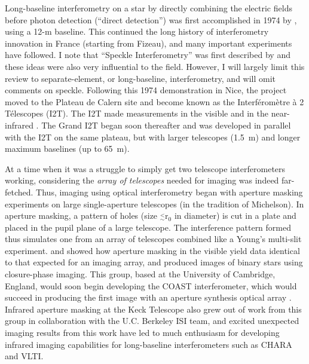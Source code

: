 \documentclass[12pt]{article}
\newcommand{\simle}{\mbox{$\stackrel{<}{_{\sim}}$}}
\begin{document}
Long-baseline interferometry on a star by directly combining the
electric fields before photon detection (``direct detection'') was
first accomplished in 1974 by \citet{labeyrie1975}, using a 12-m
baseline.  This continued the long history of interferometry
innovation in France (starting from Fizeau), and many important
experiments have followed.  I note that ``Speckle Interferometry''
was first described by \citet{labeyrie1970} and these ideas were also
very influential to the field.  However, I will largely limit this
review to separate-element, or long-baseline, interferometry, and will
omit comments on speckle.  Following this 1974 demonstration in Nice,
the project moved to the Plateau de Calern site and become known as
the Interf{\' e}rom{\` e}tre {\` a} 2 T{\' e}lescopes (I2T).  The I2T
made measurements in the visible \citep[e.g.,][]{blazit1977} and in
the near-infrared \citep{benedetto1983,benedetto1985}.  The Grand I2T
\citep[GI2T,][]{gi2t1994} began soon thereafter and was developed in
parallel with the I2T on the same plateau, but with larger telescopes
(1.5~m) and longer maximum baselines (up to 65~m).

At a time when it was a struggle to simply get two telescope
interferometers working, considering the {\em array of telescopes}
needed for imaging was indeed far-fetched. Thus, imaging using optical
interferometry began with aperture masking experiments on large
single-aperture telescopes (in the tradition of Michelson).  In
aperture masking, a pattern of holes (size $\simle$r$_0$ in diameter)
is cut in a plate and placed in the pupil plane of a large telescope.
The interference pattern formed thus simulates one from an array of
telescopes combined like a Young's multi-slit experiment.
\citet{baldwin1986} and \citet{haniff1987} showed how aperture masking
in the visible yield data identical to that expected for an imaging
array, and produced images of binary stars using closure-phase
imaging.  This group, based at the University of Cambridge, England,
would soon begin developing the COAST interferometer, which would
succeed in producing the first image with an aperture synthesis
optical array \citep{baldwin1996}.  Infrared aperture masking at the
Keck Telescope \citep{tuthill2000} also grew out of work from this group 
in collaboration with the U.C. Berkeley ISI team, and excited
unexpected imaging results from this work have led to much enthusiasm
for developing infrared imaging capabilities for long-baseline
interferometers such as CHARA and VLTI.
\end{document}
